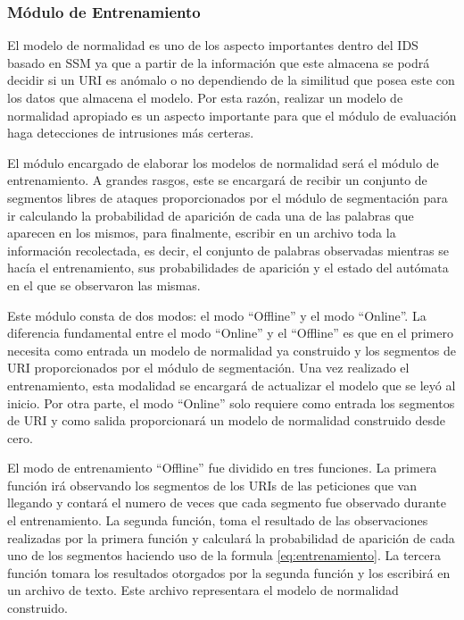 \subsubsection{Módulo de Entrenamiento}\label{sec:entrenamiento}

El modelo de normalidad es uno de los aspecto importantes dentro del IDS basado en SSM ya que a partir de la información que este almacena se podrá decidir si un URI es anómalo o no dependiendo de la similitud que posea este con los datos que almacena el modelo. Por esta razón, realizar un modelo de normalidad apropiado es un aspecto  importante para que el módulo de evaluación haga detecciones de intrusiones más certeras.

El módulo encargado de elaborar los modelos de normalidad será el módulo de entrenamiento. A grandes rasgos, este se encargará de recibir un conjunto de segmentos libres de ataques proporcionados por el módulo de segmentación para ir calculando la probabilidad de aparición de cada una de las palabras que aparecen en los mismos, para finalmente, escribir en un archivo toda la información recolectada, es decir, el conjunto de palabras observadas mientras se hacía el entrenamiento, sus probabilidades de aparición y el estado del autómata en el que se observaron las mismas.

Este módulo consta de dos modos: el modo ``Offline'' y el modo ``Online''. La  diferencia fundamental entre el modo ``Online'' y el ``Offline'' es que en el primero necesita como entrada un modelo de normalidad ya construido y los segmentos de URI proporcionados por el módulo de segmentación. Una vez realizado el entrenamiento, esta modalidad se encargará de actualizar el modelo que se leyó al inicio. Por otra parte, el modo ``Online'' solo requiere como entrada los segmentos de URI y como salida proporcionará un  modelo de normalidad construido desde cero.

El modo de entrenamiento ``Offline'' fue dividido en tres funciones. La primera función irá observando los segmentos de los URIs de las peticiones que van llegando y contará el numero de veces que cada segmento fue observado durante el entrenamiento. La segunda función, toma el resultado de las observaciones realizadas por la primera función y calculará la probabilidad de aparición de cada uno de los segmentos haciendo uso de la formula \ref{eq:entrenamiento}. La tercera función tomara los resultados otorgados por la segunda función y los escribirá en un archivo de texto. Este archivo representara el modelo de normalidad construido.

